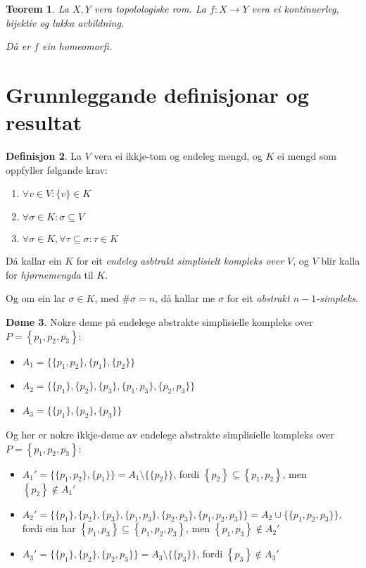 \documentclass[a4paper, 12pt, norsk]{article}
\theoremstyle{plain}
\newtheorem{theorem}{Teorem}[section]
\theoremstyle{definition}
\newtheorem{definition}[theorem]{Definisjon}
\newtheorem{example}[theorem]{Døme}
\newcommand{\union}{ \mathop{\cup}\limits }
\newcommand{\set}[1]{ \left\{ #1 \right\} } %
\begin{document}
\begin{theorem} \label{thm:bijektiv-lukka-homeomorfi}
	La \( X, Y \) vera topolologiske rom. La \( f: X \to Y \) vera ei kontinuerleg, bijektiv og lukka avbildning.

	Då er \( f \) ein homeomorfi.
\end{theorem}

\section{Grunnleggande definisjonar og resultat}

\begin{definition} \label{def:ASK}
	La $V$ vera ei ikkje-tom og endeleg mengd, og \( K \) ei mengd som oppfyller følgande krav: 
	\begin{enumerate}
		\item{$\forall v \in V: \{v\} \in K$}
		\item{\( \forall \sigma \in K: \sigma \subseteq V \)}
		\item{$\forall \sigma \in K, \forall \tau \subseteq \sigma: \tau \in K$}
	\end{enumerate}

	Då kallar ein $K$ for eit \emph{endeleg asbtrakt simplisielt kompleks over $V$}, og $V$ blir kalla for \emph{hjørnemengda} til $K$.

	Og om ein lar \( \sigma \in K \), med \( \#\sigma = n \), då kallar me \( \sigma \) for eit \emph{abstrakt \( n-1 \)-simpleks}.
\end{definition}

\begin{example}
	Nokre døme på endelege abstrakte simplisielle kompleks over \( P=\set{p_1, p_2, p_3} \):

	\begin{itemize}
		\item{$A_1=\{\{p_1, p_2\}, \{p_1\}, \{p_2\}\}$}
		\item{$A_2=\{\{p_1\}, \{p_2\}, \{p_3\}, \{p_1, p_3\}, \{p_2, p_3\}\}$}
		\item{$A_3=\{\{p_1\}, \{p_2\}, \{p_3\}\}$}
	\end{itemize}

	Og her er nokre ikkje-døme av endelege abstrakte simplisielle kompleks over \( P=\set{p_1, p_2, p_3} \):

	\begin{itemize}
		\item{$A_1'=\{\{p_1, p_2\}, \{p_1\}\}=A_1 \setminus \{\{p_2\}\}$, fordi \( \set{p_2} \subseteq \set{p_1, p_2} \), men \( \set{p_2} \not\in A_1' \)}
		\item{$A_2'=\{\{p_1\}, \{p_2\}, \{p_3\}, \{p_1, p_3\}, \{p_2, p_3\}, \{p_1, p_2, p_3\}\}=A_2 \union \{\{p_1, p_2, p_3\}\}$, fordi ein har \( \set{p_1, p_3} \subseteq \set{p_1, p_2, p_3} \), men \( \set{p_1, p_3} \not\in A_2' \)}
		\item{$A_3'=\{\{p_1\}, \{p_2\}, \{p_2, p_3\}\}=A_3 \setminus \{\{p_3\}\}$, fordi \( \set{p_3} \not\in A_3' \)}
	\end{itemize}
\end{example}
\end{document}
